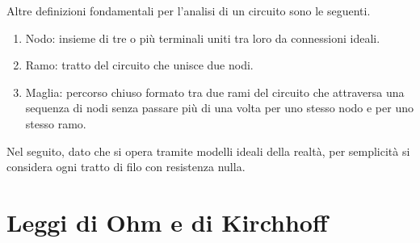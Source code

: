 Altre definizioni fondamentali per l'analisi di un circuito sono le seguenti.
\begin{defn}\hfill
    \begin{enumerate} 
        \item Nodo: insieme di tre o più terminali uniti tra loro da connessioni ideali.
        \item Ramo: tratto del circuito che unisce due nodi.
        \item Maglia: percorso chiuso formato tra due rami del circuito che attraversa una sequenza di nodi senza passare più di una volta per uno stesso nodo e per uno stesso ramo.
    \end{enumerate}
\end{defn}
\begin{obs}
    Nel seguito, dato che si opera tramite modelli ideali della realtà, per semplicità si considera ogni tratto di filo con resistenza nulla.
\end{obs}

\section{Leggi di Ohm e di Kirchhoff}
